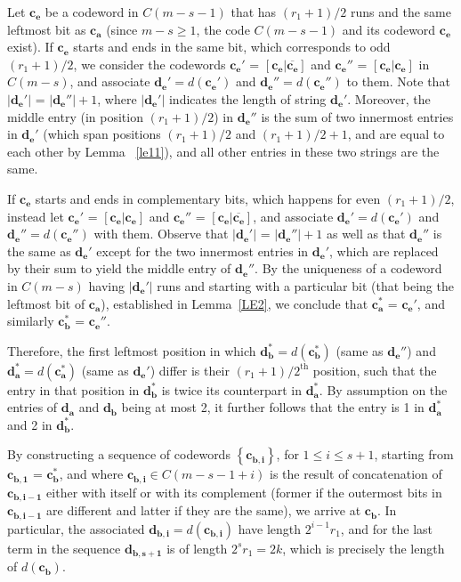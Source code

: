 Let $\mathbf{c_e}$ be a codeword in $C(m-s-1)$ that has
$(r_1+1)/2$ runs and the same leftmost bit as $\mathbf{c_a^{}}$
(since $m-s \geq 1$, the code $C(m-s-1)$ and its codeword
$\mathbf{c_e}$ exist). If $\mathbf{c_e}$ starts and ends in the
same bit, which corresponds to odd $(r_1+1)/2$, we consider the
codewords $\mathbf{c_e'}$ =
$[\mathbf{c_e}|\overline{\mathbf{c_e}}]$ and $\mathbf{c_e''}$ =
$[\mathbf{c_e}|\mathbf{c_e}]$ in $C(m-s)$, and associate
$\mathbf{d_e'}=d(\mathbf{c_e'})$ and
$\mathbf{d_e''}=d(\mathbf{c_e''})$ to them. Note that
$|\mathbf{d_e'}|$ = $|\mathbf{d_e''}|+1$, where $|\mathbf{d_e'}|$
indicates the length of string $\mathbf{d_e'}$. Moreover, the
middle entry (in position $(r_1+1)/2$) in $\mathbf{d_e''}$ is the
sum of two innermost entries in $\mathbf{d_e'}$ (which span
positions $(r_1+1)/2$ and $(r_1+1)/2+1$, and are equal to each
other by Lemma ~\ref{le11}), and all other entries in these two
strings are the same.

If $\mathbf{c_e}$ starts and ends in complementary bits, which
happens for even $(r_1+1)/2$, instead let $\mathbf{c_e'}$ =
$[\mathbf{c_e}|\mathbf{c_e}]$ and $\mathbf{c_e''}$ =
$[\mathbf{c_e}|\overline{\mathbf{c_e}}]$, and associate
$\mathbf{d_e'}=d(\mathbf{c_e'})$ and
$\mathbf{d_e''}=d(\mathbf{c_e''})$ with them. Observe that
$|\mathbf{d_e'}|$ = $|\mathbf{d_e''}|+1$ as well as that
$\mathbf{d_e''}$ is the same as $\mathbf{d_e'}$ except for the two
innermost entries in $\mathbf{d_e'}$, which are replaced by their
sum to yield the middle entry of $\mathbf{d_e''}$. By the
uniqueness of a codeword in $C(m-s)$ having $|\mathbf{d_e'}|$ runs
and starting with a particular bit (that being the leftmost bit of
$\mathbf{c_a}$), established in Lemma~\ref{LE2}, we conclude that
$\mathbf{c_a^{*}}$ = $\mathbf{c_e'}$, and similarly
$\mathbf{c_b^{*}}$ = $\mathbf{c_e''}$.


Therefore, the first leftmost position in which
$\mathbf{d_b^{*}}=d(\mathbf{c_b^{*}})$ (same as $\mathbf{d_e''}$)
and $\mathbf{d_a^{*}}=d(\mathbf{c_a^{*}})$ (same as
$\mathbf{d_e'}$) differ is their $(r_1+1)/2^{\text{th}}$ position,
such that the entry in that position in $\mathbf{d_b^{*}}$ is
twice its counterpart in $\mathbf{d_a^{*}}$. By assumption on the
entries of $\mathbf{d_a}$ and $\mathbf{d_b}$ being at most 2, it
further follows that the entry is 1 in $\mathbf{d_a^{*}}$ and 2 in
$\mathbf{d_b^{*}}$.

By constructing a sequence of codewords
$\left\{\mathbf{c_{b,i}}\right\}$, for $1 \leq i \leq s+1$,
starting from $\mathbf{c_{b,1}}$ = $\mathbf{c_b^{*}}$, and where
$\mathbf{c_{b,i}} \in C(m-s-1+i)$ is the result of concatenation
of $\mathbf{c_{b,i-1}}$ either with itself or with its complement
(former if the outermost bits in $\mathbf{c_{b,i-1}}$ are
different and latter if they are the same), we arrive at
$\mathbf{c_b}$. In particular, the associated
$\mathbf{d_{b,i}}=d(\mathbf{c_{b,i}})$ have length $2^{i-1}r_1$,
and for the last term in the sequence $\mathbf{d_{b,s+1}}$ is of
length $2^s r_1=2k$, which is precisely the length of
$d(\mathbf{c_{b}})$.

